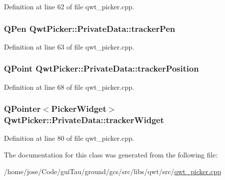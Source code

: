Definition at line 62 of file qwt\-\_\-picker.\-cpp.

\hypertarget{class_qwt_picker_1_1_private_data_ae3a116d09a5ca75c1907e1f8626dff46}{
\subsubsection[{tracker\-Pen}]{\setlength{\rightskip}{0pt plus 5cm}Q\-Pen Qwt\-Picker\-::\-Private\-Data\-::tracker\-Pen}}\label{class_qwt_picker_1_1_private_data_ae3a116d09a5ca75c1907e1f8626dff46}


Definition at line 63 of file qwt\-\_\-picker.\-cpp.

\hypertarget{class_qwt_picker_1_1_private_data_a775c3c8e66d084169dd39808b6986087}{
\subsubsection[{tracker\-Position}]{\setlength{\rightskip}{0pt plus 5cm}Q\-Point Qwt\-Picker\-::\-Private\-Data\-::tracker\-Position}}\label{class_qwt_picker_1_1_private_data_a775c3c8e66d084169dd39808b6986087}


Definition at line 68 of file qwt\-\_\-picker.\-cpp.

\hypertarget{class_qwt_picker_1_1_private_data_a09596dc058e68d208622e136c3dd9b6e}{
\subsubsection[{tracker\-Widget}]{\setlength{\rightskip}{0pt plus 5cm}Q\-Pointer$<${\bf Picker\-Widget}$>$ Qwt\-Picker\-::\-Private\-Data\-::tracker\-Widget}}\label{class_qwt_picker_1_1_private_data_a09596dc058e68d208622e136c3dd9b6e}


Definition at line 80 of file qwt\-\_\-picker.\-cpp.



The documentation for this class was generated from the following file\-:\begin{DoxyCompactItemize}
\item 
/home/jose/\-Code/gui\-Tau/ground/gcs/src/libs/qwt/src/\hyperlink{qwt__picker_8cpp}{qwt\-\_\-picker.\-cpp}\end{DoxyCompactItemize}
